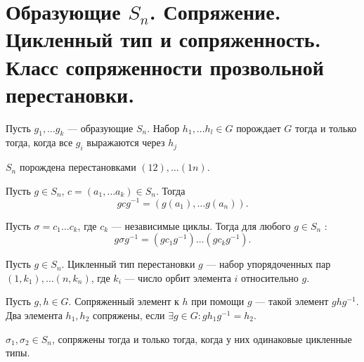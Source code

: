 % 
% 
\section{Образующие $ S_n$. Сопряжение. Цикленный тип и сопряженность.  Класс сопряженности прозвольной перестановки.}
\begin{st}
    Пусть $ g_1, \ldots g_k$ --- образующие $ S_{n} $. Набор $ h_1, \ldots h_l \in G$ порождает $ G$  тогда и только тогда, когда все $ g_i$ выражаются через  $ h_j$
\end{st}
\begin{st}
    $ S_{n}  $ порождена перестановками $ (12), \ldots (1n)$.
\end{st}
\begin{st}
    Пусть $ g \in S_{n} $, $ c = (a_1, \ldots a_k) \in S_{n} $. Тогда 
    \[
	gcg^{-1} = \left( g(a_1), \ldots g(a_n) \right) 
    .\] 
\end{st}
\begin{st}
    Пусть $ \sigma = c_1\ldots c_k$, где $ c_k$ --- независимые циклы. Тогда для любого   $ g \in S_{n} $ :
    \[
	g \sigma g^{-1} = (gc_1g^{-1})\ldots (gc_k g^{-1})
    .\] 
\end{st}
\begin{defn}
    Пусть $ g \in S_{n} $. {\sf Цикленный тип } перестановки $ g$ --- набор упорядоченных пар  $ (1, k_1), \ldots (n, k_n)$, где $ k_i$ --- число орбит элемента  $ i $ относительно $ g$. 
\end{defn}
\begin{defn}
    Пусть $ g, h \in G$. {\sf Сопряженный элемент к $ h$ при помощи  $ g$} --- такой элемент $ g h g^{-1}$. Два элемента $ h_1, h_2$ {\sf сопряжены}, если  $ \exists g \in G\colon gh_1g^{-1} = h_2$.    
\end{defn}
\begin{thm}
    $ \sigma _1, \sigma _2 \in S_{n} $, сопряжены  тогда и только тогда, когда у них одинаковые цикленные типы.
\end{thm}
% 
